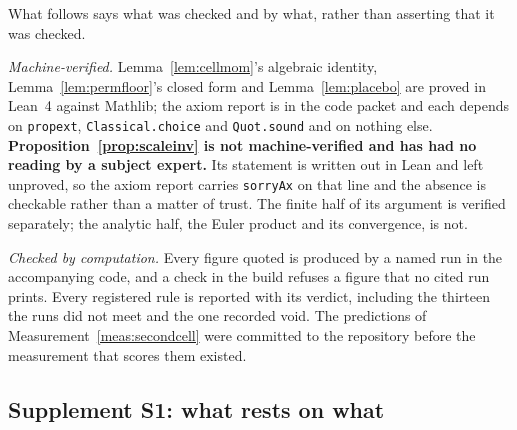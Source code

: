\documentclass[11pt,a4paper]{article}
\theoremstyle{plain}
\theoremstyle{definition}
\theoremstyle{remark}
\begin{document}
What follows says what was checked and by what, rather than asserting
that it was checked.

\emph{Machine-verified.} Lemma~\ref{lem:cellmom}'s algebraic identity,
Lemma~\ref{lem:permfloor}'s closed form and Lemma~\ref{lem:placebo}
are proved in Lean~4 against Mathlib; the axiom report is in the code
packet and each depends on \texttt{propext}, \texttt{Classical.choice}
and \texttt{Quot.sound} and on nothing else. \textbf{Proposition~\ref{prop:scaleinv}
is not machine-verified and has had no reading by a subject expert.}
Its statement is written out in Lean and left unproved, so the axiom
report carries \texttt{sorryAx} on that line and the absence is
checkable rather than a matter of trust. The finite half of its
argument is verified separately; the analytic half, the Euler product
and its convergence, is not.

\emph{Checked by computation.} Every figure quoted is produced by a
named run in the accompanying code, and a check in the build refuses a
figure that no cited run prints. Every registered rule is reported with
its verdict, including the thirteen the runs did not meet and the one
recorded void. The predictions of Measurement~\ref{meas:secondcell} were
committed to the repository before the measurement that scores them
existed.

\subsection*{Supplement S1: what rests on what}
\end{document}
